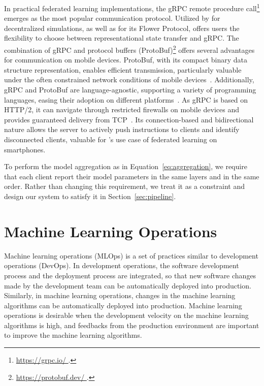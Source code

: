 In practical federated learning implementations,
the gRPC remote procedure call\footnote{\url{
    https://grpc.io/
}.} emerges as the most popular communication protocol.
Utilized by \cite{tff,patrick2022openfl} for decentralized simulations,
as well as \cite{beutel2020flower} for its Flower Protocol,
\cite{madrigal2023project}
offers users the flexibility to choose between representational state transfer
and gRPC. The combination of gRPC and protocol buffers (ProtoBuf)\footnote{\url{
    https://protobuf.dev/
}.} offers several advantages for communication on mobile devices. ProtoBuf,
with its compact binary data structure representation,
enables efficient transmission,
particularly valuable under the often constrained network conditions of mobile
devices~\cite{popic2016performance}. Additionally,
gRPC and ProtoBuf are language-agnostic,
supporting a variety of programming languages,
easing their adoption on different platforms~\cite{araujo2020performance}.
As gRPC is based on HTTP/2,
it can navigate through restricted firewalls on mobile devices and provides
guaranteed delivery from TCP~\cite{araujo2020performance}.
Its connection-based and bidirectional nature allows the server to actively push
instructions to clients and identify disconnected clients,
valuable for \fedcampus's use case of federated learning on smartphones.

To perform the model aggregation as in Equation~\ref{eq:aggregation},
we require that each client report their model parameters in the same layers and
in the same order. Rather than changing this requirement,
we treat it as a constraint and design our system to satisfy it in
Section~\ref{sec:pipeline}.

\section{Machine Learning Operations}

Machine learning operations (MLOps) is a set of practices similar to
development operations (DevOps).
In development operations,
the software development process and the deployment process are integrated,
so that new software changes made by the development team can be
automatically deployed into production.
Similarly, in machine learning operations,
changes in the machine learning algorithms can be automatically deployed into
production.
Machine learning operations is desirable when the development velocity on
the machine learning algorithms is high,
and feedbacks from the production environment are important to improve
the machine learning algorithms.
